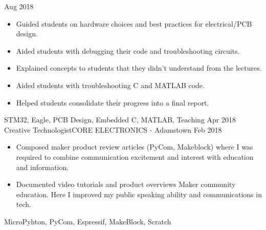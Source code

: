 \begin{experiences}
		{Aug 2018}	{
			\begin{itemize}
				\item Guided students on hardware choices and best practices for electrical/PCB design.
				\item Aided students with debugging their code and troubleshooting circuits.
				\item Explained concepts to students that they didn't understand from the lectures.
				\item Aided students with troubleshooting C and MATLAB code.
				\item Helped students consolidate their progress into a final report.
			\end{itemize}
		}
		{STM32, Eagle, PCB Design, Embedded C, MATLAB, Teaching}
	\emptySeparator
	\experience
		{Apr 2018}    {Creative Technologist}{CORE ELECTRONICS - Adamstown}
		{Feb 2018}    {
			\begin{itemize}
				\item Composed maker product review articles (PyCom, Makeblock) where I was required to combine communication excitement and interest with education and information.
				\item Documented video tutorials and product overviews Maker community education. Here I improved my public speaking ability and communications in tech.
			\end{itemize}
		}
		{MicroPyhton, PyCom, Espressif, MakeBlock, Scratch}
	\end{experiences}
